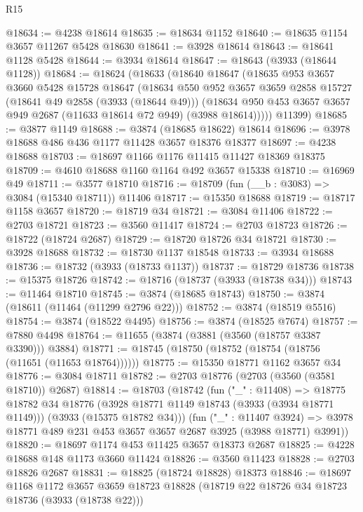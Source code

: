 \begin{lexlean}{R15}
\begin{coremodule}
@18634 := @4238 @18614
@18635 := @18634 @1152
@18640 := @18635 @1154 @3657 @11267 @5428 @18630
@18641 := @3928 @18614
@18643 := @18641 @1128 @5428
@18644 := @3934 @18614
@18647 := @18643 (@3933 (@18644 @1128))
@18684 := @18624
    (@18633
      (@18640
        @18647
        (@18635
          @953
          @3657
          @3660
          @5428
          @15728
          @18647
          (@18634
            @550
            @952
            @3657
            @3659
            @2858
            @15727
            (@18641 @49 @2858 (@3933 (@18644 @49)))
            (@18634 @950 @453 @3657 @3657 @949 @2687 (@11633 @18614 @72 @949) (@3988 @18614)))))
      @11399)
@18685 := @3877 @1149
@18688 := @3874 (@18685 @18622) @18614
@18696 := @3978 @18688 @486 @436 @1177 @11428 @3657 @18376 @18377
@18697 := @4238 @18688
@18703 := @18697 @1166 @1176 @11415 @11427 @18369 @18375
@18709 := @4610 @18688 @1160 @1164 @492 @3657 @15338
@18710 := @16969 @49
@18711 := @3577 @18710
@18716 := @18709 (fun (__b : @3083) => @3084 (@15340 @18711)) @11406
@18717 := @15350 @18688
@18719 := @18717 @1158 @3657
@18720 := @18719 @34
@18721 := @3084 @11406
@18722 := @2703 @18721
@18723 := @3560 @11417
@18724 := @2703 @18723
@18726 := @18722 (@18724 @2687)
@18729 := @18720 @18726 @34 @18721
@18730 := @3928 @18688
@18732 := @18730 @1137 @18548
@18733 := @3934 @18688
@18736 := @18732 (@3933 (@18733 @1137))
@18737 := @18729 @18736
@18738 := @15375 @18726
@18742 := @18716 (@18737 (@3933 (@18738 @34)))
@18743 := @11464 @18710
@18745 := @3874 (@18685 @18743)
@18750 := @3874 (@18611 (@11464 (@11299 @2796 @22)))
@18752 := @3874 (@18519 @5516)
@18754 := @3874 (@18522 @4495)
@18756 := @3874 (@18525 @7674)
@18757 := @7880 @4498
@18764 := @11655 (@3874 (@3881 (@3560 (@18757 @3387 @3390))) @3884)
@18771 := @18745 (@18750 (@18752 (@18754 (@18756 (@11651 (@11653 @18764))))))
@18775 := @15350 @18771 @1162 @3657 @34
@18776 := @3084 @18711
@18782 := @2703 @18776 (@2703 (@3560 (@3581 @18710)) @2687)
@18814 := @18703
    (@18742
      (fun ("_" : @11408) =>
      @18775
        @18782
        @34
        @18776
        (@3928 @18771 @1149 @18743 (@3933 (@3934 @18771 @1149)))
        (@3933 (@15375 @18782 @34)))
      (fun ("_" : @11407 @3924) =>
      @3978 @18771 @489 @231 @453 @3657 @3657 @2687 @3925 (@3988 @18771) @3991))
@18820 := @18697 @1174 @453 @11425 @3657 @18373 @2687
@18825 := @4228 @18688 @148 @1173 @3660 @11424
@18826 := @3560 @11423
@18828 := @2703 @18826 @2687
@18831 := @18825 (@18724 @18828) @18373
@18846 := @18697
    @1168
    @1172
    @3657
    @3659
    @18723
    @18828
    (@18719 @22 @18726 @34 @18723 @18736 (@3933 (@18738 @22)))

\end{coremodule}
\end{lexlean}
